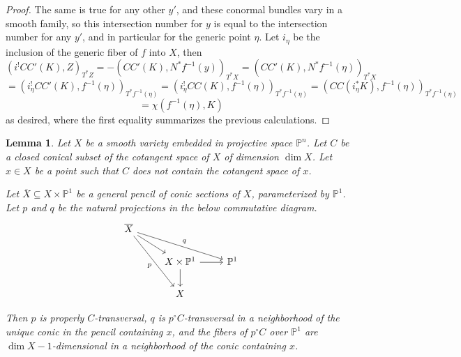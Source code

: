 \documentclass[12pt]{amsart}
\newtheorem{lemma}[theorem]{Lemma}
\theoremstyle{definition}
\theoremstyle{remark}
\begin{document}
\begin{proof}
The same is true for any other $y'$, and these conormal bundles vary in a smooth family, so this intersection number for $y$ is equal to the intersection number for any $y'$, and in particular for the generic point $\eta$. Let $i_\eta$ be the inclusion of the generic fiber of $f$ into $X$, then \[( i^! CC'(K), Z)_{T^*Z}  = - (CC'(K),  N^* f^{-1}(y))_{T^*X} = (CC'(K), N^* f^{-1}(\eta))_{T^*X}\] 
\[ = (i_\eta^! CC'(K), f^{-1}(\eta))_{T^* f^{-1}(\eta)}  =  (i_\eta^! CC(K), f^{-1}(\eta))_{T^* f^{-1}(\eta)} =  ( CC(i_\eta^* K) , f^{-1}(\eta))_{T^* f^{-1}(\eta)}\] \[= \chi(f^{-1}(\eta),K) \] as desired, where the first equality summarizes the previous calculations.\end{proof}

\begin{lemma}\label{genericity-lemma} Let $X$ be a smooth variety embedded in projective space $\mathbb P^n$. Let $C$ be a closed conical subset of the cotangent space of $X$ of dimension $\dim X$. Let $x \in X$ be a point such that $C$ does not contain the cotangent space of $x$.

Let $\overline{X} \subseteq X \times \mathbb P^1$ be a general pencil of conic sections of $X$, parameterized by $\mathbb P^1$.  Let $p$ and $q$ be the natural projections in the below commutative diagram.\begin{equation}\label{pq-diagram}\begin{tikzcd} \overline{X}  \arrow[ddr,"p"'] \arrow[drr,"q"] \arrow[dr]  \\  &X \times \mathbb P^1 \arrow[r] \arrow[d] & \mathbb P^1 \\ & X \end{tikzcd} \end{equation}

Then $p$ is properly $C$-transversal, $q$ is $p^{\circ} C$-transversal in a neighborhood of the unique conic in the pencil containing $x$, and the fibers of $p^\circ C$ over $\mathbb P^1$ are $\dim X-1$-dimensional in a neighborhood of the conic containing $x$. \end{lemma}
\end{document}
